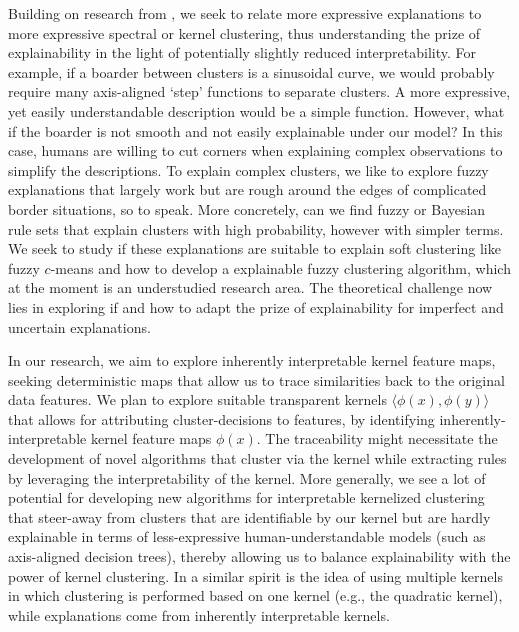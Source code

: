 \documentclass[a4paper,11pt]{article}
\begin{document}
Building on research from \rto, we seek to relate more expressive explanations to more expressive spectral or kernel clustering,
thus understanding the prize of explainability in the light of potentially slightly reduced interpretability.
For example, if a boarder between clusters is a sinusoidal curve, we would probably require many axis-aligned `step' functions to separate clusters. A more expressive, yet easily understandable description would be a simple function. 
However, what if the boarder is not smooth and not easily explainable under our model?
In this case, humans are willing to cut corners when explaining complex observations to simplify the descriptions.
To explain complex clusters, we like to explore fuzzy explanations that largely work but are rough around the edges of complicated border situations, so to speak. 
More concretely, can we find fuzzy or Bayesian rule sets that explain clusters with high probability, however with simpler terms.
We seek to study if these explanations are suitable to explain soft clustering like fuzzy $c$-means and how to develop a \joint explainable fuzzy clustering algorithm, which at the moment is an understudied research area.
The theoretical challenge now lies in exploring if and how to adapt the prize of explainability for imperfect and uncertain explanations. 

In our research, we aim to explore inherently interpretable kernel feature maps, seeking deterministic maps that allow us to trace similarities back to the original data features. 
We plan to explore suitable transparent kernels $\langle \phi(x), \phi(y) \rangle$ that allows for attributing cluster-decisions to features, by identifying inherently-interpretable kernel feature maps $\phi(x)$. 
The traceability might necessitate the development of novel algorithms that cluster via the kernel while extracting rules by leveraging the interpretability of the kernel. 
More generally, we see a lot of potential for developing new algorithms for interpretable kernelized clustering that steer-away from
clusters that are identifiable by our kernel but are hardly explainable in terms of less-expressive human-understandable models (such as axis-aligned decision trees), thereby allowing us to balance explainability with the power of kernel clustering.
In a similar spirit is the idea of using multiple kernels in which clustering is performed based on one kernel (e.g., the quadratic kernel), while explanations come from inherently interpretable kernels.
\end{document}
